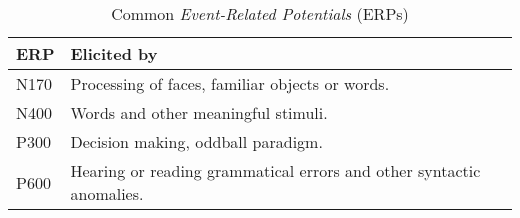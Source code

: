 \begin{table}
    \centering
    \begin{tabular}{ll}
        \toprule
        ERP & Elicited by
        \\
        \midrule
        N170 & Processing of faces, familiar objects or words.
        \\
        N400 & Words and other meaningful stimuli.
        \\
        P300 & Decision making, oddball paradigm.
        \\
        P600 & Hearing or reading grammatical errors and other syntactic anomalies.
        \\
        \bottomrule
    \end{tabular}
    \caption{Common \emph{Event-Related Potentials} (ERPs)}\label{table:erps}
\end{table}
